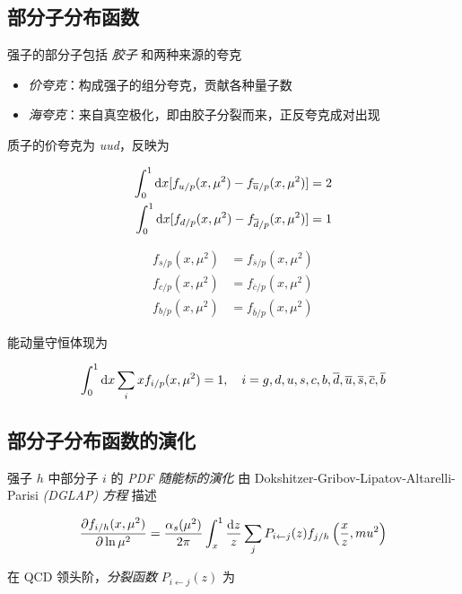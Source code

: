 \subsection{部分子分布函数}

强子的部分子包括 \emph{胶子} 和两种来源的夸克

\begin{itemize}
    \item \emph{价夸克}：构成强子的组分夸克，贡献各种量子数
    \item \emph{海夸克}：来自真空极化，即由胶子分裂而来，正反夸克成对出现
\end{itemize}

质子的价夸克为 \emph{uud}，反映为

\begin{align}
    \int_0^1 \mathop{}\!\mathrm{d} x [f_{u/p}(x, \mu^2) - f_{\overline{u}/p}(x, \mu^2)] &= 2 \\
    \int_0^1 \mathop{}\!\mathrm{d} x [f_{d/p}(x, \mu^2) - f_{\overline{d}/p}(x, \mu^2)] &= 1
\end{align}

\begin{align}
    f_{s/p}(x, \mu^2) &= f_{\overline{s}/p}(x, \mu^2) \\
    f_{c/p}(x, \mu^2) &= f_{\overline{c}/p}(x, \mu^2) \\
    f_{b/p}(x, \mu^2) &= f_{\overline{b}/p}(x, \mu^2)
\end{align}

能动量守恒体现为

\begin{equation}
    \int_0^1 \mathop{}\!\mathrm{d} x \sum_i x f_{i/p}(x, \mu^2) = 1, \quad i = g, d, u, s, c, b, \overline{d}, \overline{u}, \overline{s}, \overline{c}, \overline{b}
\end{equation}

\subsection{部分子分布函数的演化}

强子 $h$ 中部分子 $i$ 的 \emph{PDF 随能标的演化} 由 Dokshitzer-Gribov-Lipatov-Altarelli-Parisi \emph{(DGLAP) 方程} 描述

\begin{equation}
    \frac{\partial f_{i/h}(x, \mu^2)}{\partial \ln \mu^2} = \frac{\alpha_s(\mu^2)}{2\pi} \int_x^1 \frac{\mathop{}\!\mathrm{d} z}{z} \sum_j P_{i \gets j}(z) f_{j/h}\left(\frac{x}{z}, mu^2\right)
\end{equation}

在 QCD 领头阶，\emph{分裂函数} $P_{i \gets j}(z)$ 为

